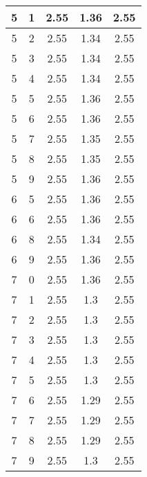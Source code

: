 \begin{longtable}{|c|c||c||c||c|}
	5 & 1 & 2.55 & 1.36 & 2.55 \\ \hline
	5 & 2 & 2.55 & 1.34 & 2.55 \\ \hline
	5 & 3 & 2.55 & 1.34 & 2.55 \\ \hline
	5 & 4 & 2.55 & 1.34 & 2.55 \\ \hline
	5 & 5 & 2.55 & 1.36 & 2.55 \\ \hline
	5 & 6 & 2.55 & 1.36 & 2.55 \\ \hline
	5 & 7 & 2.55 & 1.35 & 2.55 \\ \hline
	5 & 8 & 2.55 & 1.35 & 2.55 \\ \hline
	5 & 9 & 2.55 & 1.36 & 2.55 \\ \hline
	6 & 5 & 2.55 & 1.36 & 2.55 \\ \hline
	6 & 6 & 2.55 & 1.36 & 2.55 \\ \hline
	6 & 8 & 2.55 & 1.34 & 2.55 \\ \hline
	6 & 9 & 2.55 & 1.36 & 2.55 \\ \hline
	7 & 0 & 2.55 & 1.36 & 2.55 \\ \hline
	7 & 1 & 2.55 & 1.3 & 2.55 \\ \hline
	7 & 2 & 2.55 & 1.3 & 2.55 \\ \hline
	7 & 3 & 2.55 & 1.3 & 2.55 \\ \hline
	7 & 4 & 2.55 & 1.3 & 2.55 \\ \hline
	7 & 5 & 2.55 & 1.3 & 2.55 \\ \hline
	7 & 6 & 2.55 & 1.29 & 2.55 \\ \hline
	7 & 7 & 2.55 & 1.29 & 2.55 \\ \hline
	7 & 8 & 2.55 & 1.29 & 2.55 \\ \hline
	7 & 9 & 2.55 & 1.3 & 2.55 \\ \hline
\end{longtable}
\clearpage{}
